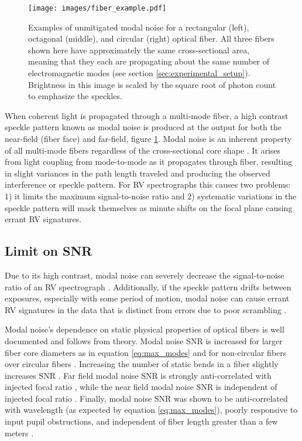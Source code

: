 \documentclass[twocolumn]{emulateapj}
\begin{document}

\begin{figure}
\centering
	\texttt{[image: images/fiber\_example.pdf]}
	\caption{Examples of unmitigated modal noise for a rectangular (left), octagonal (middle), and circular (right) optical fiber. All three fibers shown here have approximately the same cross-sectional area, meaning that they each are propagating about the same number of electromagnetic modes (see section \ref{sec:experimental_setup}). Brightness in this image is scaled by the square root of photon count to emphasize the speckles.}
\label{fig:fiber_example}
\end{figure}

When coherent light is propagated through a multi-mode fiber, a high contrast speckle pattern known as modal noise is produced at the output for both the near-field (fiber face) and far-field, figure \ref{fig:fiber_example}. Modal noise is an inherent property of all multi-mode fibers regardless of the cross-sectional core shape \citep{Sablowski2015}. It arises from light coupling from mode-to-mode as it propagates through fiber, resulting in slight variances in the path length traveled and producing the observed interference or speckle pattern. For RV spectrographs this causes two problems: 1) it limits the maximum signal-to-noise ratio and 2) systematic variations in the speckle pattern will mask themselves as minute shifts on the focal plane causing errant RV signatures.

\subsection{Limit on SNR}

Due to its high contrast, modal noise can severely decrease the signal-to-noise ratio of an RV spectrograph \citep{Epworth1978, Baudrand2001, Lemke2011}. Additionally, if the speckle pattern drifts between exposures, especially with some period of motion, modal noise can cause errant RV signatures in the data that is distinct from errors due to poor scrambling \citep{Mahadevan2014}.

Modal noise's dependence on static physical properties of optical fibers is well documented and follows from theory. Modal noise SNR is increased for larger fiber core diameters as in equation \ref{eq:max_modes} \citep{Sablowski2015, Lemke2010} and for non-circular fibers over circular fibers \citep{Sturmer2016, Sablowski2015}. Increasing the number of static bends in a fiber slightly increases SNR \citep{Imai1979}. Far field modal noise SNR is strongly anti-correlated with injected focal ratio \citep{Sablowski2015}, while the near field modal noise SNR is independent of injected focal ratio \citep{Baudrand2001}. Finally, modal noise SNR was shown to be anti-correlated with wavelength (as expected by equation \ref{eq:max_modes}), poorly responsive to input pupil obstructions, and independent of fiber length greater than a few meters \citep{Baudrand2001}.
\end{document}
